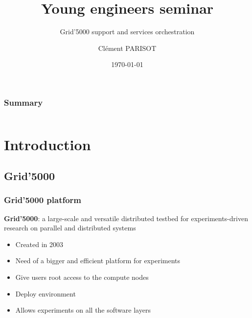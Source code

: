 \documentclass[11pt,compress]{beamer}
\author{Clément PARISOT}
\title{Young engineers seminar}
\subtitle{Grid'5000 support and services orchestration}
\institute{IJD INRIA Nancy\\MADYNES Team\vspace{2.75cm}}
\begin{document}
\date{\scriptsize \today}

{
\begin{frame}[plain]
  \titlepage
\end{frame}
}
\addtocounter{framenumber}{-1}

\begin{frame}
\frametitle{Summary}
\begin{columns}[t]
  \begin{column}{5cm}
  \tableofcontents[sections={1-3},hideothersubsections]
  \end{column}
  \begin{column}{5cm}
  \tableofcontents[sections={4-6},hideothersubsections]
  \end{column}
  \end{columns}
\end{frame}

\section{Introduction}
\subsection{Grid'5000}
\begin{frame}
\frametitle{Grid'5000 platform}
\begin{block}{}
\textbf{Grid'5000}: a large-scale and versatile distributed testbed for experiments-driven research on parallel and distributed systems
\end{block}
\begin{itemize}
\item Created in 2003
\item Need of a bigger and efficient platform for experiments

\item Give users root access to the compute nodes
\item Deploy environment
\item Allows experiments on all the software layers
\end{itemize}
\end{frame}
\end{document}
